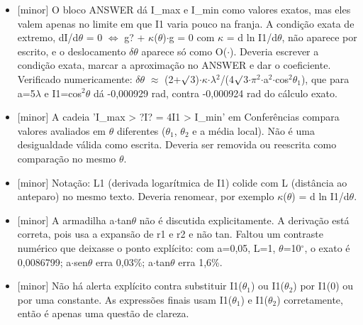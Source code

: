 \documentclass{article}%
\begin{document}
\begin{itemize}%
\item%
{[}minor{]} O bloco ANSWER dá I\_max e I\_min como valores exatos, mas eles valem apenas no limite em que I1 varia pouco na franja. A condição exata de extremo, dI/d$\theta$ = 0 $\Leftrightarrow$ g? + $\kappa$($\theta$)$\cdot$g = 0 com $\kappa$ = d ln I1/d$\theta$, não aparece por escrito, e o deslocamento $\delta$$\theta$ aparece só como O($\cdot$). Deveria escrever a condição exata, marcar a aproximação no ANSWER e dar o coeficiente. Verificado numericamente: $\delta$$\theta$ $\approx$ (2+$\surd$3)$\cdot$$\kappa$$\cdot$$\lambda$$^2$/(4$\surd$3$\cdot$$\pi$$^2$$\cdot$a$^2$$\cdot$cos$^2$$\theta$$_{1}$), que para a=5$\lambda$ e I1=cos$^2$$\theta$ dá -0,000929 rad, contra -0,000924 rad do cálculo exato.%
\item%
{[}minor{]} A cadeia 'I\_max > ?I? = 4I1 > I\_min' em Conferências compara valores avaliados em $\theta$ diferentes ($\theta$$_{1}$, $\theta$$_{2}$ e a média local). Não é uma desigualdade válida como escrita. Deveria ser removida ou reescrita como comparação no mesmo $\theta$.%
\item%
{[}minor{]} Notação: L1 (derivada logarítmica de I1) colide com L (distância ao anteparo) no mesmo texto. Deveria renomear, por exemplo $\kappa$($\theta$) = d ln I1/d$\theta$.%
\item%
{[}minor{]} A armadilha a$\cdot$tan$\theta$ não é discutida explicitamente. A derivação está correta, pois usa a expansão de r1 e r2 e não tan. Faltou um contraste numérico que deixasse o ponto explícito: com a=0,05, L=1, $\theta$=10$^\circ$, o exato é 0,0086799; a$\cdot$sen$\theta$ erra 0,03\%; a$\cdot$tan$\theta$ erra 1,6\%.%
\item%
{[}minor{]} Não há alerta explícito contra substituir I1($\theta$$_{1}$) ou I1($\theta$$_{2}$) por I1(0) ou por uma constante. As expressões finais usam I1($\theta$$_{1}$) e I1($\theta$$_{2}$) corretamente, então é apenas uma questão de clareza.%
\end{itemize}%
\end{document}
